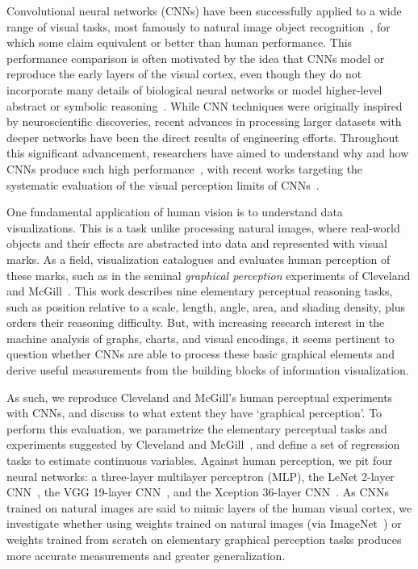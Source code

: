 
\maketitle

Convolutional neural networks (CNNs) have been successfully applied to a wide range of visual tasks, most famously to natural image object recognition~\cite{krizhevsky_imagenet2012, simonyan_very_deep2014, szegedy2015}, for which some claim equivalent or better than human performance. This performance comparison is often motivated by the idea that CNNs model or reproduce the early layers of the visual cortex, even though they do not incorporate many details of biological neural networks or model higher-level abstract or symbolic reasoning~\cite{yamins2016using, hassabis2017neuroscience, human_vs_machine_vision}. While CNN techniques were originally inspired by neuroscientific discoveries, recent advances in processing larger datasets with deeper networks have been the direct results of engineering efforts. Throughout this significant advancement, researchers have aimed to understand why and how CNNs produce such high performance~\cite{goodfellow_book, deeplearning_blackbox2017}, with recent works targeting the systematic evaluation of the visual perception limits of CNNs~\cite{clevr, not_so_clevr}.

One fundamental application of human vision is to understand data visualizations. This is a task unlike processing natural images, where real-world objects and their effects are abstracted into data and represented with visual marks. As a field, visualization catalogues and evaluates human perception of these marks, such as in the seminal \emph{graphical perception} experiments of Cleveland and McGill~\cite{cleveland_mcgill}. This work describes nine elementary perceptual reasoning tasks, such as position relative to a scale, length, angle, area, and shading density, plus orders their reasoning difficulty. But, with increasing research interest in the machine analysis of graphs, charts, and visual encodings, it seems pertinent to question whether CNNs are able to process these basic graphical elements and derive useful measurements from the building blocks of information visualization.

As such, we reproduce Cleveland and McGill's human perceptual experiments with CNNs, and discuss to what extent they have `graphical perception'. To perform this evaluation, we parametrize the elementary perceptual tasks and experiments suggested by Cleveland and McGill~\cite{cleveland_mcgill}, and define a set of regression tasks to estimate continuous variables. Against human perception, we pit four neural networks: a three-layer multilayer perceptron (MLP), the LeNet 2-layer CNN~\cite{lenet}, the VGG 19-layer CNN~\cite{simonyan_very_deep2014}, and the Xception 36-layer CNN~\cite{xception}. As CNNs trained on natural images are said to mimic layers of the human visual cortex, we investigate whether using weights trained on natural images (via ImageNet~\cite{imagenet}) or weights trained from scratch on elementary graphical perception tasks produces more accurate measurements and greater generalization.

